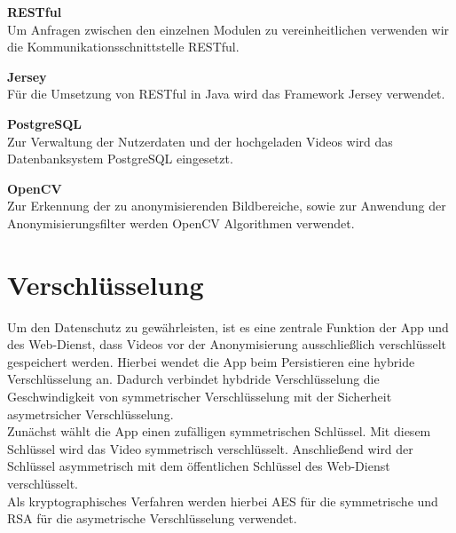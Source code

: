 \begin{description}
\item \textbf{RESTful} \hfill \\
Um Anfragen zwischen den einzelnen Modulen zu vereinheitlichen verwenden wir die Kommunikationsschnittstelle RESTful.

\item \textbf{Jersey} \hfill \\
Für die Umsetzung von RESTful in Java wird das Framework Jersey verwendet.

\item \textbf{PostgreSQL} \hfill \\
Zur Verwaltung der Nutzerdaten und der hochgeladen Videos wird das Datenbanksystem PostgreSQL eingesetzt.

\item \textbf{OpenCV} \hfill \\
Zur Erkennung der zu anonymisierenden Bildbereiche, sowie zur Anwendung der Anonymisierungsfilter werden OpenCV Algorithmen verwendet.

\end{description}

\section{Verschlüsselung}

Um den Datenschutz zu gewährleisten, ist es eine zentrale Funktion der App und des Web-Dienst, dass Videos vor der Anonymisierung ausschließlich verschlüsselt gespeichert werden. Hierbei wendet die App beim Persistieren eine hybride Verschlüsselung an. Dadurch verbindet hybdride Verschlüsselung die Geschwindigkeit von symmetrischer Verschlüsselung mit der Sicherheit asymetrsicher Verschlüsselung.\\
Zunächst wählt die App einen zufälligen symmetrischen Schlüssel. Mit diesem Schlüssel wird das Video symmetrisch verschlüsselt. Anschließend wird der Schlüssel asymmetrisch mit dem öffentlichen Schlüssel des Web-Dienst verschlüsselt. \\
Als kryptographisches Verfahren werden hierbei AES für die symmetrische und RSA für die asymetrische Verschlüsselung verwendet.
